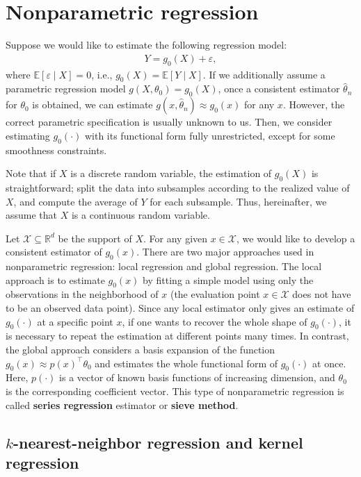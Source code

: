 \documentclass[10.5pt, A4paper, openany, uplatex]{book}
\newcommand{\mcl}{\mathcal}
\newcommand{\eps}{\varepsilon}
\newcommand{\E}{\mathbb{E}}
\renewcommand{\hat}{\widehat}
\numberwithin{equation}{section}
\begin{document}
\section{Nonparametric regression}

Suppose we would like to estimate the following regression model:
\begin{align}\label{eq:nonpara}
	Y = g_0(X) + \eps,
\end{align}
where $\E[\eps \mid X] = 0$, i.e., $g_0(X) = \E[Y \mid X]$.
If we additionally assume a parametric regression model $g(X, \theta_0) = g_0(X)$, once a consistent estimator $\hat \theta_n$ for $\theta_0$ is obtained, we can estimate $g(x, \hat \theta_n) \approx g_0(x)$ for any $x$.
However, the correct parametric specification is usually unknown to us.
Then, we consider estimating $g_0(\cdot)$ with its functional form fully unrestricted, except for some smoothness constraints.

Note that if $X$ is a discrete random variable, the estimation of $g_0(X)$ is straightforward; split the data into subsamples according to the realized value of $X$, and compute the average of $Y$ for each subsample.
Thus, hereinafter, we assume that $X$ is a continuous random variable.

\bigskip

Let $\mcl{X} \subseteq \mathbb{R}^d$ be the support of $X$.
For any given $x \in \mcl{X}$, we would like to develop a consistent estimator of $g_0(x)$.
There are two major approaches used in nonparametric regression: local regression and global regression.
The local approach is to estimate $g_0(x)$ by fitting a simple model using only the observations in the neighborhood of $x$ (the evaluation point $x \in \mcl{X}$ does not have to be an observed data point).
Since any local estimator only gives an estimate of $g_0(\cdot)$ at a specific point $x$, if one wants to recover the whole shape of $g_0(\cdot)$, it is necessary to repeat the estimation at different points many times.
In contrast, the global approach considers a basis expansion of the function $g_0(x)\approx p(x)^\top \theta_0$ and estimates the whole functional form of $g_0(\cdot)$ at once.
Here, $p(\cdot)$ is a vector of known basis functions of increasing dimension, and $\theta_0$ is the corresponding coefficient vector.
This type of nonparametric regression is called \textbf{series regression} estimator or \textbf{sieve method}.

\subsection{$k$-nearest-neighbor regression and kernel regression}\label{subsec:kernel}
\end{document}
